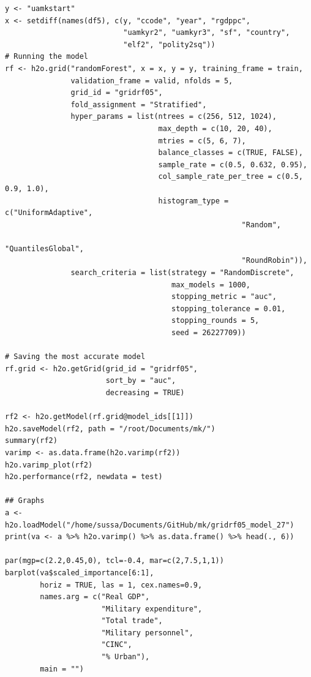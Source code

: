 \begin{verbatim}
y <- "uamkstart"
x <- setdiff(names(df5), c(y, "ccode", "year", "rgdppc",
                           "uamkyr2", "uamkyr3", "sf", "country",
                           "elf2", "polity2sq")) 
# Running the model
rf <- h2o.grid("randomForest", x = x, y = y, training_frame = train, 
               validation_frame = valid, nfolds = 5, 
               grid_id = "gridrf05",
               fold_assignment = "Stratified",
               hyper_params = list(ntrees = c(256, 512, 1024),
                                   max_depth = c(10, 20, 40),
                                   mtries = c(5, 6, 7),
                                   balance_classes = c(TRUE, FALSE),
                                   sample_rate = c(0.5, 0.632, 0.95),
                                   col_sample_rate_per_tree = c(0.5, 0.9, 1.0),
                                   histogram_type = c("UniformAdaptive",
                                                      "Random",
                                                      "QuantilesGlobal",
                                                      "RoundRobin")),
               search_criteria = list(strategy = "RandomDiscrete", 
                                      max_models = 1000, 
                                      stopping_metric = "auc", 
                                      stopping_tolerance = 0.01, 
                                      stopping_rounds = 5, 
                                      seed = 26227709)) 
                                      
# Saving the most accurate model
rf.grid <- h2o.getGrid(grid_id = "gridrf05",
                       sort_by = "auc",
                       decreasing = TRUE)

rf2 <- h2o.getModel(rf.grid@model_ids[[1]])
h2o.saveModel(rf2, path = "/root/Documents/mk/")
summary(rf2)
varimp <- as.data.frame(h2o.varimp(rf2))
h2o.varimp_plot(rf2)
h2o.performance(rf2, newdata = test)

## Graphs
a <- h2o.loadModel("/home/sussa/Documents/GitHub/mk/gridrf05_model_27")
print(va <- a %>% h2o.varimp() %>% as.data.frame() %>% head(., 6)) 

par(mgp=c(2.2,0.45,0), tcl=-0.4, mar=c(2,7.5,1,1))
barplot(va$scaled_importance[6:1],
        horiz = TRUE, las = 1, cex.names=0.9,
        names.arg = c("Real GDP", 
                      "Military expenditure",
                      "Total trade", 
                      "Military personnel",
                      "CINC", 
                      "% Urban"),
        main = "")


\end{verbatim}
